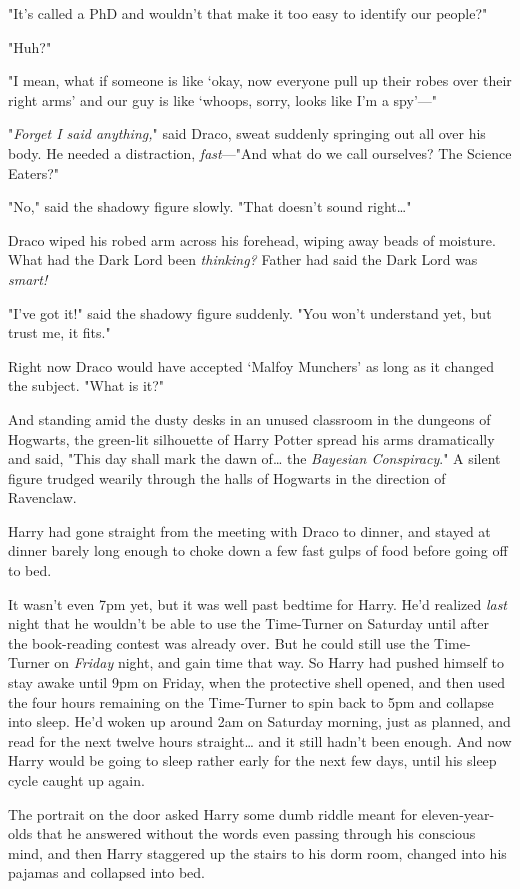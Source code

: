 "It's called a PhD and wouldn't that make it too easy to identify our people?"

"Huh?"

"I mean, what if someone is like `okay, now everyone pull up their robes over
their right arms' and our guy is like `whoops, sorry, looks like I'm a spy'---"

"\emph{Forget I said anything,}" said Draco, sweat suddenly springing out all
over his body. He needed a distraction, \emph{fast}---"And what do we call
ourselves? The Science Eaters?"

"No," said the shadowy figure slowly. "That doesn't sound right{\ldots}"

Draco wiped his robed arm across his forehead, wiping away beads of moisture.
What had the Dark Lord been \emph{thinking?} Father had said the Dark Lord was
\emph{smart!}

"I've got it!" said the shadowy figure suddenly. "You won't understand yet, but
trust me, it fits."

Right now Draco would have accepted `Malfoy Munchers' as long as it changed the
subject. "What is it?"

And standing amid the dusty desks in an unused classroom in the dungeons of
Hogwarts, the green-lit silhouette of Harry Potter spread his arms dramatically
and said, "This day shall mark the dawn of{\ldots} the \emph{Bayesian
Conspiracy}."
\sbreak
A silent figure trudged wearily through the halls of Hogwarts in the direction
of Ravenclaw.

Harry had gone straight from the meeting with Draco to dinner, and stayed at
dinner barely long enough to choke down a few fast gulps of food before going
off to bed.

It wasn't even 7pm yet, but it was well past bedtime for Harry. He'd realized
\emph{last} night that he wouldn't be able to use the Time-Turner on Saturday
until after the book-reading contest was already over. But he could still use
the Time-Turner on \emph{Friday} night, and gain time that way. So Harry had
pushed himself to stay awake until 9pm on Friday, when the protective shell
opened, and then used the four hours remaining on the Time-Turner to spin back
to 5pm and collapse into sleep. He'd woken up around 2am on Saturday morning,
just as planned, and read for the next twelve hours straight{\ldots} and it
still hadn't been enough. And now Harry would be going to sleep rather early
for the next few days, until his sleep cycle caught up again.

The portrait on the door asked Harry some dumb riddle meant for
eleven-year-olds that he answered without the words even passing through his
conscious mind, and then Harry staggered up the stairs to his dorm room,
changed into his pajamas and collapsed into bed.


